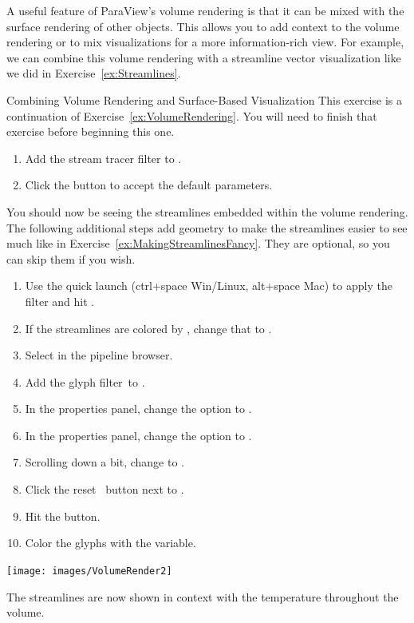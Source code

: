 A useful feature of ParaView's volume rendering is that it can be mixed
with the surface rendering of other objects.  This allows you to add
context to the volume rendering or to mix visualizations for a more
information-rich view.  For example, we can combine this volume rendering
with a streamline vector visualization like we did in
Exercise~\ref{ex:Streamlines}.

\begin{exercise}{Combining Volume Rendering and Surface-Based Visualization}
  \label{ex:CombiningVolumeAndSurfaceRendering}%
  This exercise is a continuation of Exercise~\ref{ex:VolumeRendering}.
  You will need to finish that exercise before beginning this one.

  \begin{enumerate}
  \item Add the stream tracer filter \streamTracer to
    .
  \item Click the \apply button to accept the default parameters.
    \savecounter
  \end{enumerate}

  You should now be seeing the streamlines embedded within the volume
  rendering.  The following additional steps add geometry to make the
  streamlines easier to see much like in
  Exercise~\ref{ex:MakingStreamlinesFancy}.  They are optional, so you can
  skip them if you wish.

  \begin{enumerate}
    \restorecounter
  \item Use the quick launch (ctrl+space Win/Linux, alt+space Mac) to apply
    the  filter and hit \apply.
  \item If the streamlines are colored by , change that to
    .
  \item Select  in the pipeline browser.
  \item Add the glyph filter~\glyph to .
  \item In the properties panel, change the  option to
    .
  \item In the properties panel, change the  option to
    .
  \item Scrolling down a bit, change  to .
  \item Click the reset~ button next to .
  \item Hit the \apply button.
  \item Color the glyphs with the  variable.
  \end{enumerate}

  \begin{inlinefig}
    \texttt{[image: images/VolumeRender2]}
  \end{inlinefig}

  The streamlines are now shown in context with the temperature throughout
  the volume.
\end{exercise}

